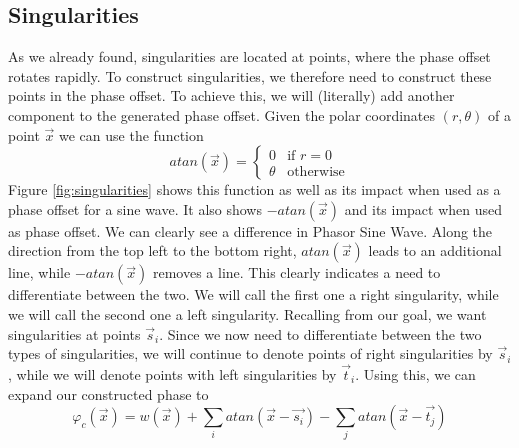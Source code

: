 \documentclass{utue} %
\begin{document}
\subsection{Singularities}
As we already found, singularities are located at points, where the phase offset rotates rapidly. To construct singularities, we therefore need to construct these points in the phase offset. To achieve this, we will (literally) add another component to the generated phase offset. Given the polar coordinates $(r, \theta)$ of a point $\vec{x}$ we can use the function
$$
atan(\vec{x}) = \begin{cases}
  0 & \text{if } r = 0\\
  \theta &\text{otherwise}
\end{cases}
$$
Figure \ref{fig:singularities} shows this function as well as its impact when used as a phase offset for a sine wave. It also shows $-atan(\vec{x})$ and its impact when used as phase offset. We can clearly see a difference in Phasor Sine Wave. Along the direction from the top left to the bottom right, $atan(\vec{x})$ leads to an additional line, while $-atan(\vec{x})$ removes a line. This clearly indicates a need to differentiate between the two. We will call the first one a right singularity, while we will call the second one a left singularity. Recalling from our goal, we want singularities at points $\vec{s}_i$. Since we now need to differentiate between the two types of singularities, we will continue to denote points of right singularities by $\vec{s}_i$, while we will denote points with left singularities by $\vec{t}_i$. Using this, we can expand our constructed phase to
$$
\varphi_c(\vec{x}) = w(\vec{x}) + \sum_i atan(\vec{x}-\vec{s_i}) - \sum_j atan(\vec{x}-\vec{t_j})
$$
\end{document}
